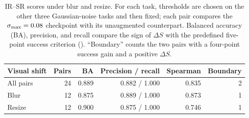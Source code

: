 \begin{table}[!htb]
\centering
\caption{IR--SR scores under blur and resize. For each task, thresholds are chosen on the other three Gaussian-noise tasks and then fixed; each pair compares the $\sigma_{\max}{}=0.08$ checkpoint with its unaugmented counterpart. Balanced accuracy (BA), precision, and recall compare the sign of $\Delta S$ with the predefined five-point success criterion (). ``Boundary'' counts the two pairs with a four-point success gain and a positive $\Delta S$.}
\label{tab:cross-stressor-ir-sr-summary}
\small
\setlength{\tabcolsep}{4pt}
\begin{tabular}{lrrrrr}
\toprule
Visual shift & Pairs & BA & Precision / recall & Spearman & Boundary \\
\midrule
All pairs & 24 & 0.889 & 0.882 / 1.000 & 0.835 & 2 \\
Blur & 12 & 0.875 & 0.889 / 1.000 & 0.873 & 1 \\
Resize & 12 & 0.900 & 0.875 / 1.000 & 0.746 & 1 \\
\bottomrule
\end{tabular}
\end{table}
